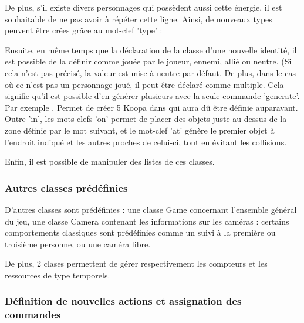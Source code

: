 De plus, s'il existe divers personnages qui possèdent aussi cette énergie, il est souhaitable de ne pas avoir à répéter cette ligne.
Ainsi, de nouveaux types peuvent être crées grâce au mot-clef 'type' :

Ensuite, en même temps que la déclaration de la classe d'une nouvelle identité, il est possible de la définir comme jouée par le joueur, ennemi, allié ou neutre.
(Si cela n'est pas précisé, la valeur est mise à neutre par défaut.
De plus, dans le cas où ce n'est pas un personnage joué, il peut être déclaré comme multiple.
Cela signifie qu'il est possible d'en générer plusieurs avec la seule commande 'generate'.
Par exemple . Permet de créer 5 Koopa dans  qui aura dû être définie
auparavant. Outre 'in', les mots-clefs 'on' permet de placer des objets juste au-dessus de la zone définie par le mot suivant, et le mot-clef 'at' génère
le premier objet à l'endroit indiqué et les autres proches de celui-ci, tout en évitant les collisions.

Enfin, il est possible de manipuler des listes de ces classes.

\subsubsection{Autres classes prédéfinies}

D'autres classes sont prédéfinies : une classe Game concernant l'ensemble général du jeu, une classe Camera contenant les informations sur les caméras :
certains comportements classiques sont prédéfinies comme un suivi à la première ou troisième personne, ou une caméra libre.

De plus, 2 clases permettent de gérer respectivement les compteurs et les ressources de type temporels.

\subsubsection{Définition de nouvelles actions et assignation des commandes}

